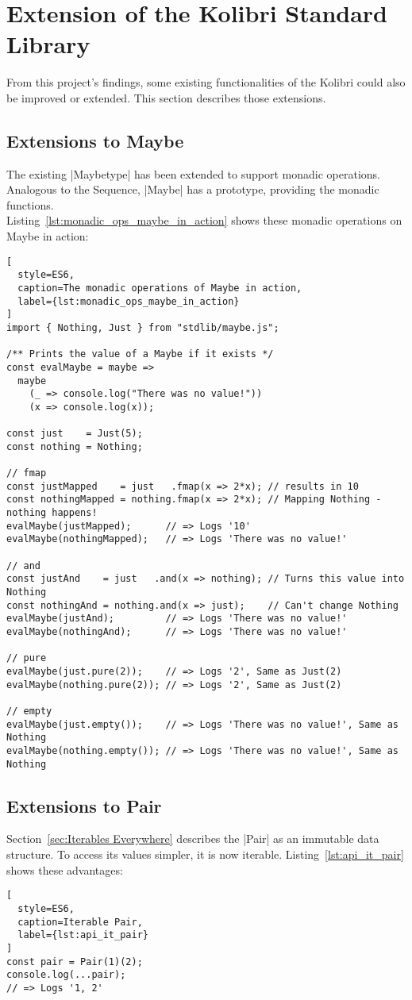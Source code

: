 \section{Extension of the Kolibri Standard Library}
From this project's findings, some existing functionalities of the Kolibri
could also be improved or extended. This section describes those extensions.

\subsection{Extensions to Maybe} %
\label{sub:Extensions to Maybe}
The existing |Maybetype| has been extended to support monadic operations.
Analogous to the Sequence, |Maybe| has a prototype, providing the monadic
functions. \\ 
Listing~\ref{lst:monadic_ops_maybe_in_action} shows these monadic operations on
Maybe in action:

\begin{lstlisting}[
  style=ES6,
  caption=The monadic operations of Maybe in action,
  label={lst:monadic_ops_maybe_in_action}
]
import { Nothing, Just } from "stdlib/maybe.js";

/** Prints the value of a Maybe if it exists */
const evalMaybe = maybe =>
  maybe
    (_ => console.log("There was no value!"))
    (x => console.log(x));

const just    = Just(5);
const nothing = Nothing;

// fmap 
const justMapped    = just   .fmap(x => 2*x); // results in 10
const nothingMapped = nothing.fmap(x => 2*x); // Mapping Nothing - nothing happens!
evalMaybe(justMapped);      // => Logs '10'
evalMaybe(nothingMapped);   // => Logs 'There was no value!' 

// and
const justAnd    = just   .and(x => nothing); // Turns this value into Nothing
const nothingAnd = nothing.and(x => just);    // Can't change Nothing
evalMaybe(justAnd);         // => Logs 'There was no value!'
evalMaybe(nothingAnd);      // => Logs 'There was no value!' 

// pure
evalMaybe(just.pure(2));    // => Logs '2', Same as Just(2)
evalMaybe(nothing.pure(2)); // => Logs '2', Same as Just(2)

// empty
evalMaybe(just.empty());    // => Logs 'There was no value!', Same as Nothing
evalMaybe(nothing.empty()); // => Logs 'There was no value!', Same as Nothing
\end{lstlisting}

\subsection{Extensions to Pair} %
\label{sub:Extensions to Pair}
Section~\ref{sec:Iterables Everywhere} describes the |Pair| as an immutable
data structure. To access its values simpler, it is now iterable.
Listing~\ref{lst:api_it_pair} shows these advantages:

\begin{lstlisting}[
  style=ES6,
  caption=Iterable Pair,
  label={lst:api_it_pair}
]
const pair = Pair(1)(2);
console.log(...pair);
// => Logs '1, 2'
\end{lstlisting}

